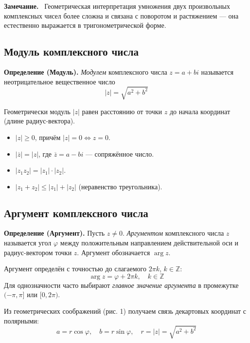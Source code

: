 \documentclass[a4paper,12pt]{article}
\newcommand{\myremark}{\textbf{Замечание.}\ }
\theoremstyle{definition}
\theoremstyle{plain}
\theoremstyle{remark}
\begin{document}
	\myremark
	Геометрическая интерпретация умножения двух произвольных комплексных чисел более сложна и связана с поворотом и растяжением — она естественно выражается в тригонометрической форме.
	
	\subsection{Модуль комплексного числа}
	
	\noindent \textbf{Определение (Модуль).}
	\textit{Модулем} комплексного числа $z = a + bi$ называется неотрицательное вещественное число
	\[
	|z| = \sqrt{a^2 + b^2}
	\]
	
	Геометрически модуль $|z|$ равен расстоянию от точки $z$ до начала координат (длине радиус-вектора).
	
	\begin{tcolorbox}[colback=gray!5, colframe=gray!50, title=Свойства модуля]
		\begin{itemize}
			\item $|z| \geq 0$, причём $|z| = 0 \iff z = 0$.
			\item $|\overline{z}| = |z|$, где $\overline{z} = a - bi$ — сопряжённое число.
			\item $|z_1 z_2| = |z_1| \cdot |z_2|$.
			\item $|z_1 + z_2| \leq |z_1| + |z_2|$ (неравенство треугольника).
		\end{itemize}
	\end{tcolorbox}
	
	\subsection{Аргумент комплексного числа}
	
	\noindent \textbf{Определение (Аргумент).}
	Пусть $z \neq 0$. \textit{Аргументом} комплексного числа $z$ называется угол $\varphi$ между положительным направлением действительной оси и радиус-вектором точки $z$. Аргумент обозначается $\arg z$.
	
	\begin{tcolorbox}[colback=blue!5, colframe=blue!40!black, title=Замечание о многозначности]
		Аргумент определён с точностью до слагаемого $2\pi k$, $k \in \mathbb{Z}$:
		\[
		\arg z = \varphi + 2\pi k,\quad k \in \mathbb{Z}
		\]
		Для однозначности часто выбирают \textit{главное значение аргумента} в промежутке $(-\pi, \pi]$ или $[0, 2\pi)$.
	\end{tcolorbox}
	
	Из геометрических соображений (рис. 1) получаем связь декартовых координат с полярными:
	\[
	a = r \cos \varphi,\quad b = r \sin \varphi,\quad r = |z| = \sqrt{a^2 + b^2}
	\]
	
\end{document}
